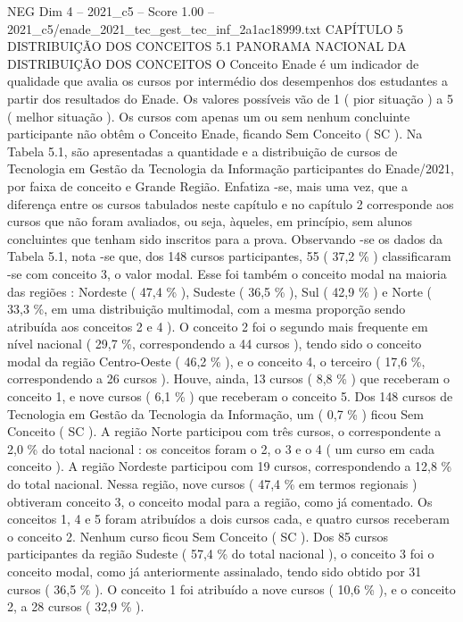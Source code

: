 \begin{textsample}{NEG Dim 4 – 2021\_c5 – Score 1.00 – 2021\_c5/enade\_2021\_tec\_gest\_tec\_inf\_2a1ac18999.txt}  \label{ex:f4_neg_147}
CAPÍTULO 5 DISTRIBUIÇÃO DOS CONCEITOS 5.1 PANORAMA NACIONAL DA DISTRIBUIÇÃO DOS CONCEITOS O Conceito Enade é um indicador de qualidade que avalia os cursos por intermédio dos desempenhos dos estudantes a partir dos resultados do Enade.
Os valores possíveis vão de 1 ( pior situação ) a 5 ( melhor situação ).
Os cursos com apenas um ou sem nenhum concluinte participante não obtêm o Conceito Enade, ficando Sem Conceito ( SC ).
Na Tabela 5.1, são apresentadas a quantidade e a distribuição de cursos de Tecnologia em Gestão da Tecnologia da Informação participantes do Enade/2021, por faixa de conceito e Grande Região.
Enfatiza -se, mais uma vez, que a diferença entre os cursos tabulados neste capítulo e no capítulo 2 corresponde aos cursos que não foram avaliados, ou seja, àqueles, em princípio, sem alunos concluintes que tenham sido inscritos para a prova.
Observando -se os dados da Tabela 5.1, nota -se que, dos 148 cursos participantes, 55 ( 37,2 \% ) classificaram -se com conceito 3, o valor modal.
Esse foi também o conceito modal na maioria das regiões : Nordeste ( 47,4 \% ), Sudeste ( 36,5 \% ), Sul ( 42,9 \% ) e Norte ( 33,3 \%, em uma distribuição multimodal, com a mesma proporção sendo atribuída aos conceitos 2 e 4 ).
O conceito 2 foi o segundo mais frequente em nível nacional ( 29,7 \%, correspondendo a 44 cursos ), tendo sido o conceito modal da região Centro-Oeste ( 46,2 \% ), e o conceito 4, o terceiro ( 17,6 \%, correspondendo a 26 cursos ).
Houve, ainda, 13 cursos ( 8,8 \% ) que receberam o conceito 1, e nove cursos ( 6,1 \% ) que receberam o conceito 5.
Dos 148 cursos de Tecnologia em Gestão da Tecnologia da Informação, um ( 0,7 \% ) ficou Sem Conceito ( SC ).
A região Norte participou com três cursos, o correspondente a 2,0 \% do total nacional : os conceitos foram o 2, o 3 e o 4 ( um curso em cada conceito ).
A região Nordeste participou com 19 cursos, correspondendo a 12,8 \% do total nacional.
Nessa região, nove cursos ( 47,4 \% em termos regionais ) obtiveram conceito 3, o conceito modal para a região, como já comentado.
Os conceitos 1, 4 e 5 foram atribuídos a dois cursos cada, e quatro cursos receberam o conceito 2.
Nenhum curso ficou Sem Conceito ( SC ).
Dos 85 cursos participantes da região Sudeste ( 57,4 \% do total nacional ), o conceito 3 foi o conceito modal, como já anteriormente assinalado, tendo sido obtido por 31 cursos ( 36,5 \% ).
O conceito 1 foi atribuído a nove cursos ( 10,6 \% ), e o conceito 2, a 28 cursos ( 32,9 \% ).

\end{textsample}
